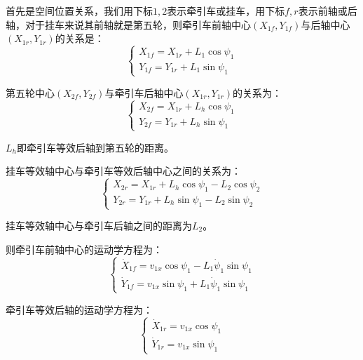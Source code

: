      首先是空间位置关系，我们用下标$1,2$表示牵引车或挂车，用下标$f,r$表示前轴或后轴，对于挂车来说其前轴就是第五轮，则牵引车前轴中心$(X_{1f},Y_{1f})$与后轴中心$(X_{1r},Y_{1r})$的关系是：
      \begin{equation}
      \begin{cases}
      X_{1f} = X_{1r} + L_1 \cos\psi_1 \\
      Y_{1f} = Y_{1r} + L_1 \sin\psi_1
      \end{cases}
      \label{eq:143}
      \end{equation}

      第五轮中心$(X_{2f},Y_{2f})$与牵引车后轴中心$(X_{1r},Y_{1r})$的关系为：
      \begin{equation}
      \begin{cases}
      X_{2f} = X_{1r} + L_h \cos\psi_1 \\
      Y_{2f} = Y_{1r} + L_h \sin\psi_1
      \end{cases}
      \label{eq:144}
      \end{equation}

      $L_h$即牵引车等效后轴到第五轮的距离。

      挂车等效轴中心与牵引车等效后轴中心之间的关系为：
      \begin{equation}
      \begin{cases}
      X_{2r} = X_{1r} + L_h \cos\psi_1 - L_2 \cos\psi_2 \\
      Y_{2r} = Y_{1r} + L_h \sin\psi_1 - L_2 \sin\psi_2
      \end{cases}
      \label{eq:145}
      \end{equation}

      挂车等效轴中心与牵引车后轴之间的距离为$L_2$。

      则牵引车前轴中心的运动学方程为：
      \begin{equation}
      \begin{cases}
      \dot{X}_{1f} = v_{1x} \cos\psi_1 - L_1\dot{\psi}_1 \sin\psi_1 \\
      \dot{Y}_{1f} = v_{1x} \sin\psi_1 + L_1\dot{\psi}_1 \sin\psi_1
      \end{cases}
      \label{eq:146}
      \end{equation}

      牵引车等效后轴的运动学方程为：
      \begin{equation}
      \begin{cases}
      \dot{X}_{1r} = v_{1x} \cos\psi_1 \\
      \dot{Y}_{1r} = v_{1x} \sin\psi_1
      \end{cases}
      \label{eq:147}
      \end{equation}

